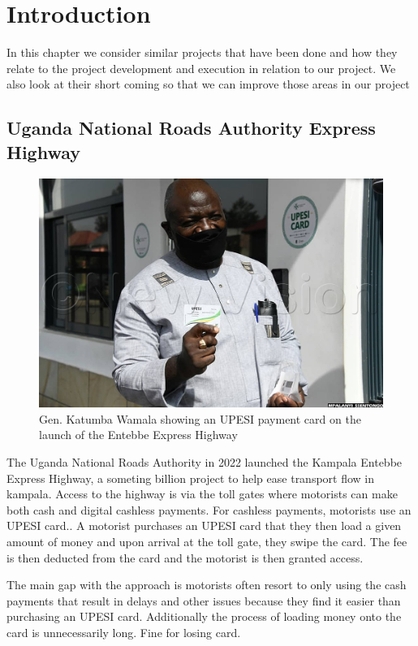\section{Introduction}
In this chapter we consider similar projects that have been done and how they relate to the project development and execution in relation to our project. We also look at their short coming so that we can improve those areas in our project

\subsection{Uganda National Roads Authority Express Highway}
\begin{figure}
    \begin{center}
        \includegraphics[scale = 0.3]{images/katus}
        \caption{Gen. Katumba Wamala showing an UPESI payment card on the launch of the Entebbe Express Highway}
    \end{center}
\end{figure}
The Uganda National Roads Authority in 2022 launched the Kampala Entebbe Express Highway, a  someting billion project to help ease transport flow in kampala. Access to the highway is via the toll gates where motorists can make both cash and digital  cashless payments. For cashless payments, motorists  use  an UPESI card.\cite{unra_news_2022}.  A motorist purchases an UPESI card that they then load a given amount of money and upon arrival at the toll gate, they swipe the card. The fee is then deducted from the card and the motorist is then granted access.

The main gap with the approach is motorists often resort to only using the cash payments that result in delays and other issues because they find it easier than purchasing an UPESI card. Additionally the process of loading money onto the card is unnecessarily long. Fine for losing card.

